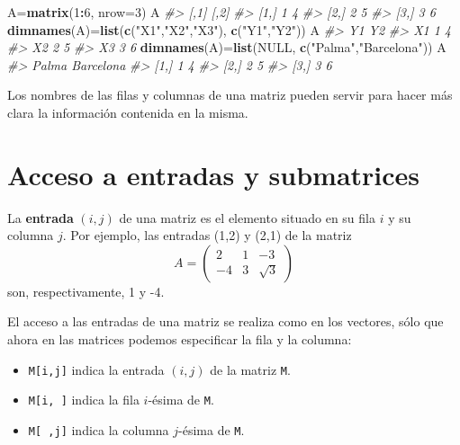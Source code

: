 \documentclass[
]{book}
\newenvironment{Shaded}{\begin{snugshade}}{\end{snugshade}}
\newcommand{\CommentTok}[1]{\textcolor[rgb]{0.56,0.35,0.01}{\textit{#1}}}
\newcommand{\DataTypeTok}[1]{\textcolor[rgb]{0.13,0.29,0.53}{#1}}
\newcommand{\DecValTok}[1]{\textcolor[rgb]{0.00,0.00,0.81}{#1}}
\newcommand{\KeywordTok}[1]{\textcolor[rgb]{0.13,0.29,0.53}{\textbf{#1}}}
\newcommand{\NormalTok}[1]{#1}
\newcommand{\OperatorTok}[1]{\textcolor[rgb]{0.81,0.36,0.00}{\textbf{#1}}}
\newcommand{\OtherTok}[1]{\textcolor[rgb]{0.56,0.35,0.01}{#1}}
\newcommand{\StringTok}[1]{\textcolor[rgb]{0.31,0.60,0.02}{#1}}
\theoremstyle{definition}
\theoremstyle{definition}
\theoremstyle{definition}
\theoremstyle{remark}
\begin{document}
\begin{Shaded}
\begin{Highlighting}[]
\NormalTok{A=}\KeywordTok{matrix}\NormalTok{(}\DecValTok{1}\OperatorTok{:}\DecValTok{6}\NormalTok{, }\DataTypeTok{nrow=}\DecValTok{3}\NormalTok{)}
\NormalTok{A}
\CommentTok{\#\textgreater{}      [,1] [,2]}
\CommentTok{\#\textgreater{} [1,]    1    4}
\CommentTok{\#\textgreater{} [2,]    2    5}
\CommentTok{\#\textgreater{} [3,]    3    6}
\KeywordTok{dimnames}\NormalTok{(A)=}\KeywordTok{list}\NormalTok{(}\KeywordTok{c}\NormalTok{(}\StringTok{"X1"}\NormalTok{,}\StringTok{"X2"}\NormalTok{,}\StringTok{"X3"}\NormalTok{), }\KeywordTok{c}\NormalTok{(}\StringTok{"Y1"}\NormalTok{,}\StringTok{"Y2"}\NormalTok{))}
\NormalTok{A}
\CommentTok{\#\textgreater{}    Y1 Y2}
\CommentTok{\#\textgreater{} X1  1  4}
\CommentTok{\#\textgreater{} X2  2  5}
\CommentTok{\#\textgreater{} X3  3  6}
\KeywordTok{dimnames}\NormalTok{(A)=}\KeywordTok{list}\NormalTok{(}\OtherTok{NULL}\NormalTok{, }\KeywordTok{c}\NormalTok{(}\StringTok{"Palma"}\NormalTok{,}\StringTok{"Barcelona"}\NormalTok{))}
\NormalTok{A}
\CommentTok{\#\textgreater{}      Palma Barcelona}
\CommentTok{\#\textgreater{} [1,]     1         4}
\CommentTok{\#\textgreater{} [2,]     2         5}
\CommentTok{\#\textgreater{} [3,]     3         6}
\end{Highlighting}
\end{Shaded}

Los nombres de las filas y columnas de una matriz pueden servir para hacer más clara la información contenida en la misma.

\hypertarget{sec:entrmatr}{%
\section{Acceso a entradas y submatrices}\label{sec:entrmatr}}

La \textbf{entrada} \((i, j)\) de una matriz es el elemento situado en su fila \(i\) y su columna \(j\). Por ejemplo, las entradas (1,2) y (2,1) de la matriz
\[
A = \left(\begin{matrix}
2 & 1 & -3\\ -4 & 3 & \sqrt{3}\end{matrix}
\right)
\]
son, respectivamente, 1 y -4.

El acceso a las entradas de una matriz se realiza como en los vectores, sólo que ahora en las matrices podemos especificar la fila y la columna:

\begin{itemize}
\item
  \texttt{M{[}i,j{]}} indica la entrada \((i, j)\) de la matriz \texttt{M}.
\item
  \texttt{M{[}i,\ {]}} indica la fila \(i\)-ésima de \texttt{M}.
\item
  \texttt{M{[}\ ,j{]}} indica la columna \(j\)-ésima de \texttt{M}.
\end{itemize}
\end{document}
